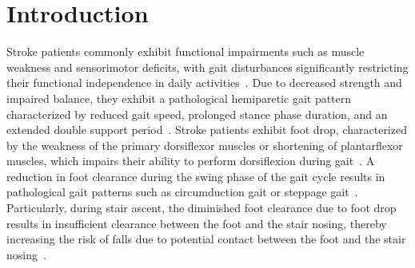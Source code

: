 \documentclass[journal,article,submit,pdftex,moreauthors]{Definitions/mdpi}
\begin{document}



\section{Introduction}
Stroke patients commonly exhibit functional impairments such as muscle weakness and sensorimotor deficits, with gait disturbances significantly restricting their functional independence in daily activities~\cite{Carolee2016,Perry1995,Bohannon2007}. Due to decreased strength and impaired balance, they exhibit a pathological hemiparetic gait pattern characterized by reduced gait speed, prolonged stance phase duration, and an extended double support period~\cite{woolley2001,Sandra1996}. Stroke patients exhibit foot drop, characterized by the weakness of the primary dorsiflexor muscles or shortening of plantarflexor muscles, which impairs their ability to perform dorsiflexion during gait~\cite{Balaban2014,Ramsay2014,Moseley1993}. A reduction in foot clearance during the swing phase of the gait cycle results in pathological gait patterns such as circumduction gait or steppage gait~\cite{Chen2005,Li2018,Mufadal2006,Roche2015}. Particularly, during stair ascent, the diminished foot clearance due to foot drop results in insufficient clearance between the foot and the stair nosing, thereby increasing the risk of falls due to potential contact between the foot and the stair nosing~\cite{Agha2021}.
\end{document}
